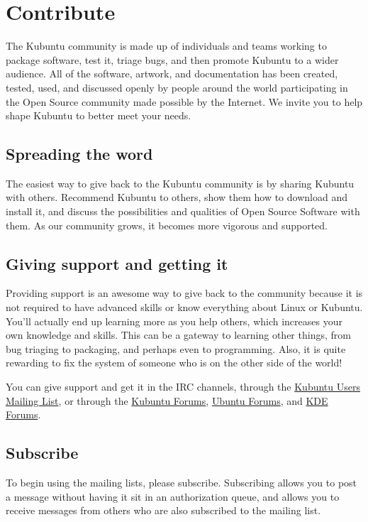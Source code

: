 \documentclass[letterpaper,10pt,english]{sphinxmanual}
\begin{document}
\chapter{Contribute}
\label{docs/contribute:contribute-link}\label{docs/contribute:contribute}\label{docs/contribute::doc}
The Kubuntu community is made up of individuals and teams working to package software, test it, triage bugs, and then promote Kubuntu to a wider audience. All of the software, artwork, and documentation has been created, tested, used, and discussed openly by people around the world participating in the Open Source community made possible by the Internet. We invite you to help shape Kubuntu to better meet your needs.


\section{Spreading the word}
\label{docs/contribute:spreading-the-word}
The easiest way to give back to the Kubuntu community is by sharing Kubuntu with others. Recommend Kubuntu to others, show them how to download and install it, and discuss the possibilities and qualities of Open Source Software with them. As our community grows, it becomes more vigorous and supported.


\section{Giving support and getting it}
\label{docs/contribute:giving-support-and-getting-it}
Providing support is an awesome way to give back to the community because it is not required to have advanced skills or know everything about Linux or Kubuntu. You'll actually end up learning more as you help others, which increases your own knowledge and skills. This can be a gateway to learning other things, from bug triaging to packaging, and perhaps even to programming. Also, it is quite rewarding to fix the system of someone who is on the other side of the world!

You can give support and get it in the IRC channels, through the \href{https://lists.ubuntu.com/mailman/listinfo/kubuntu-users}{Kubuntu Users Mailing List}, or through the \href{https://www.kubuntuforums.net/content.php}{Kubuntu Forums}, \href{http://ubuntuforums.org/}{Ubuntu Forums}, and \href{https://forum.kde.org/}{KDE Forums}.


\section{Subscribe}
\label{docs/contribute:subscribe}
To begin using the mailing lists, please subscribe. Subscribing allows you to post a message without having it sit in an authorization queue, and allows you to receive messages from others who are also subscribed to the mailing list.
\end{document}
